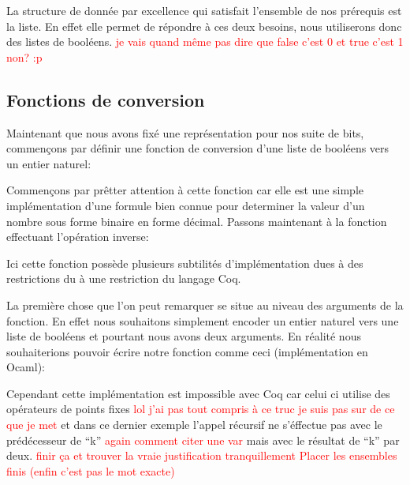 \documentclass {article}
\newcommand{\codefrom}[3]
           {}
\newcommand{\codefromOcaml}[3]
           {}
\theoremstyle{definition}
\theoremstyle{remark}
\newcommand{\todo}[1]{\textcolor{red}{#1}}
\begin{document}
La structure de donnée par excellence qui satisfait l'ensemble de nos prérequis est la liste.
En effet elle permet de répondre à ces deux besoins, nous utiliserons donc des listes de booléens.
\todo{je vais quand même pas dire que false c'est 0 et true c'est 1 non? :p}

\codefrom{src}{ast_instructions}{binary_instruction}




\subsection{Fonctions de conversion}
\label{Fonctions de conversion}
Maintenant que nous avons fixé une représentation pour nos suite de bits, commençons par définir
une fonction de conversion d'une liste de booléens vers un entier naturel:

\codefrom{src}{binary}{bitn}

Commençons par prêtter attention à cette fonction car elle est une simple implémentation
d'une formule bien connue pour determiner la valeur d'un nombre sous forme binaire
en forme décimal. Passons maintenant à la fonction effectuant l'opération inverse:

\codefrom{src}{binary}{nbit}


Ici cette fonction possède plusieurs subtilités d'implémentation dues à des restrictions du
à une restriction du langage Coq.

La première chose que l'on peut remarquer se situe au niveau des arguments de
la fonction. En effet nous souhaitons simplement encoder un entier naturel vers
une liste de booléens et pourtant nous avons deux arguments.
En réalité nous souhaiterions pouvoir écrire notre fonction comme ceci
(implémentation en Ocaml):
\codefromOcaml{rapport}{example}{nbit}

Cependant cette implémentation est impossible avec Coq car celui ci utilise
des opérateurs de points fixes \todo{lol j'ai pas tout compris à ce truc je suis
  pas sur de ce que je met} et dans ce dernier exemple l'appel récursif ne s'éffectue
pas avec le prédécesseur de ``k'' \todo{again comment citer une var} mais avec le
résultat de ``k'' par deux. \todo{finir ça et trouver la vraie justification tranquillement}
\todo{Placer les ensembles finis (enfin c'est pas le mot exacte)}


\end{document}
